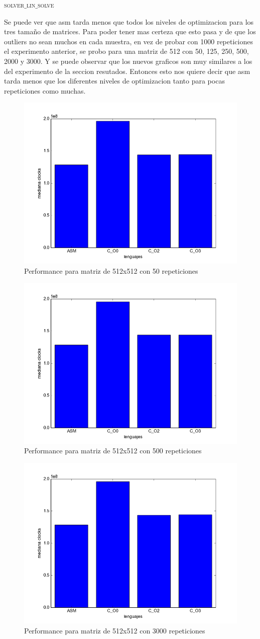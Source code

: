 {\scshape\Large solver$\_$lin$\_$solve\par}

Se puede ver que asm tarda menos que todos los niveles de optimizacion para los tres tamaño de matrices. Para poder tener mas certeza que esto pasa y de que los outliers no sean muchos en cada muestra, en vez de probar con 1000 repeticiones el experimento anterior, se probo para una matriz de 512 con 50, 125, 250, 500, 2000 y 3000. Y se puede observar que los nuevos graficos son muy similares a los del experimento de la seccion resutados. Entonces esto nos quiere decir que asm tarda menos que los diferentes niveles de optimizacion tanto para pocas repeticiones como muchas. 

\begin{figure}[h]
  \centering
  	\includegraphics[width=.6\linewidth]{Matriz_512_50.png}
  	\caption{Performance para matriz de 512x512 con 50 repeticiones}
  	\label{fig:M50it}
\end{figure}

\begin{figure}[h]
  \centering
  	\includegraphics[width=.6\linewidth]{Matriz_512_500.png}
  	\caption{Performance para matriz de 512x512 con 500 repeticiones}
  	\label{fig:M500it}
\end{figure}

\begin{figure}[h]
  \centering
  	\includegraphics[width=.6\linewidth]{Matriz_512_3000.png}
  	\caption{Performance para matriz de 512x512 con 3000 repeticiones}
  	\label{fig:M3000it}
\end{figure}
